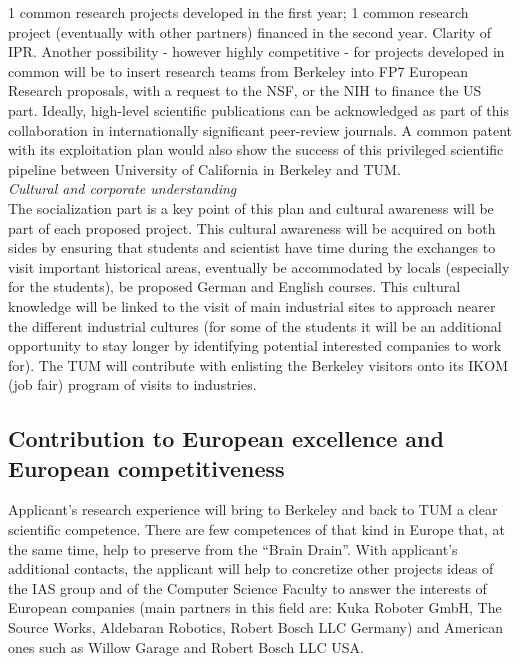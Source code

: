 1 common research projects developed in the first year;
1 common research project (eventually with other partners) financed in
the second year. Clarity of IPR.  
Another possibility - however highly competitive  - for  projects developed
in  common will  be to  insert research  teams from  Berkeley  into FP7
European Research proposals, with a request  to the NSF, or the NIH to
finance the US part.   Ideally, high-level scientific publications can
be  acknowledged  as part  of  this  collaboration in  internationally
significant   peer-review   journals.  A   common   patent  with   its
exploitation  plan would  also  show the  success  of this  privileged
scientific pipeline  between University of California  in Berkeley and
TUM.\\
\emph{Cultural  and corporate understanding}\\
The socialization  part is a
key point  of this plan  and cultural awareness  will be part  of each
proposed  project. This cultural  awareness will  be acquired  on both
sides by  ensuring that  students and scientist  have time  during the
exchanges   to  visit  important   historical  areas,   eventually  be
accommodated  by locals  (especially  for the  students), be  proposed
German and English courses. This  cultural knowledge will be linked to
the visit  of main industrial  sites to approach nearer  the different
industrial cultures (for some of the students it will be an additional
opportunity  to  stay   longer  by  identifying  potential  interested
companies to  work for).  The TUM will  contribute with  enlisting the
Berkeley visitors onto its IKOM (job fair) program of visits to industries.

\subsection{Contribution to European excellence and European competitiveness}
Applicant's  research experience  will  bring to  Berkeley and back  to TUM 
a clear scientific  competence. There are few competences of  that kind in 
Europe that, at  the same time, help to preserve  from the ``Brain Drain''.  
With applicant's additional contacts, the applicant will help to
concretize  other projects  ideas of  the  IAS group and  of the  Computer
Science Faculty  to   answer  the   interests  of  European   companies  (main
partners in this field are: Kuka Roboter GmbH, The Source
Works, Aldebaran  Robotics, Robert Bosch LLC Germany) and  American ones such as 
Willow Garage and Robert Bosch LLC USA.

